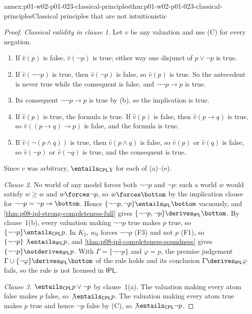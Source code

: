 \begin{annexitem}{annex:p01-w02-p01-023-classical-principles}{thm:p01-w02-p01-023-classical-principles}{Classical principles that are not intuitionistic}
\begin{proof}
\emph{Classical validity in clause 1.} Let \(v\) be any valuation and use
(C) for every negation.
\begin{enumerate}
  \item[(a)] If \(\widehat v(p)\) is false, \(\widehat v(\neg p)\) is true;
        either way one disjunct of \(p\lor\neg p\) is true.
  \item[(b)] If \(\widehat v(\neg\neg p)\) is true, then
        \(\widehat v(\neg p)\) is false, so \(\widehat v(p)\) is true. So the
        antecedent is never true while the consequent is false, and
        \(\neg\neg p\to p\) is true.
  \item[(c)] Its consequent \(\neg\neg p\to p\) is true by (b), so the
        implication is true.
  \item[(d)] If \(\widehat v(p)\) is true, the formula is true. If
        \(\widehat v(p)\) is false, then \(\widehat v(p\to q)\) is true, so
        \(\widehat v((p\to q)\to p)\) is false, and the formula is true.
  \item[(e)] If \(\widehat v(\neg(p\land q))\) is true, then
        \(\widehat v(p\land q)\) is false, so \(\widehat v(p)\) or
        \(\widehat v(q)\) is false, so \(\widehat v(\neg p)\) or
        \(\widehat v(\neg q)\) is true, and the consequent is true.
\end{enumerate}
Since \(v\) was arbitrary, \(\entails_{\mathsf{CPL}}\chi\) for each of
(a)--(e).

\emph{Clause 2.} No world of any model forces both \(\neg\neg p\) and
\(\neg p\): such a world \(w\) would satisfy \(w\geq w\) and
\(w\forces\neg p\), so \(w\forces\bottom\) by the implication clause for
\(\neg\neg p=\neg p\to\bottom\). Hence
\(\{\neg\neg p,\neg p\}\entails_{\mathsf{IPL}}\bottom\) vacuously, and
\cref{thm:p08-ipl-strong-completeness-full} gives
\(\{\neg\neg p,\neg p\}\derives_{\mathsf{IPL}}\bottom\). By clause~1(b),
every valuation making \(\neg\neg p\) true makes \(p\) true, so
\(\{\neg\neg p\}\entails_{\mathsf{CPL}}p\). In \(K_2\), \(w_0\) forces
\(\neg\neg p\) (F3) and not \(p\) (F1), so
\(\{\neg\neg p\}\not\entails_{\mathsf{IPL}}p\), and
\cref{thm:p08-ipl-completeness-soundness} gives
\(\{\neg\neg p\}\notderives_{\mathsf{IPL}}p\). With
\(\Gamma=\{\neg\neg p\}\) and \(\varphi=p\), the premise judgement
\(\Gamma\cup\{\neg\varphi\}\derives_{\mathsf{IPL}}\bottom\) of the rule
holds and its conclusion \(\Gamma\derives_{\mathsf{IPL}}\varphi\) fails, so
the rule is not licensed in \(\mathsf{IPL}\).

\emph{Clause 3.} \(\entails_{\mathsf{CPL}}p\lor\neg p\) by clause~1(a). The
valuation making every atom false makes \(p\) false, so
\(\not\entails_{\mathsf{CPL}}p\). The valuation making every atom true makes
\(p\) true and hence \(\neg p\) false by (C), so
\(\not\entails_{\mathsf{CPL}}\neg p\).
\end{proof}
\end{annexitem}

